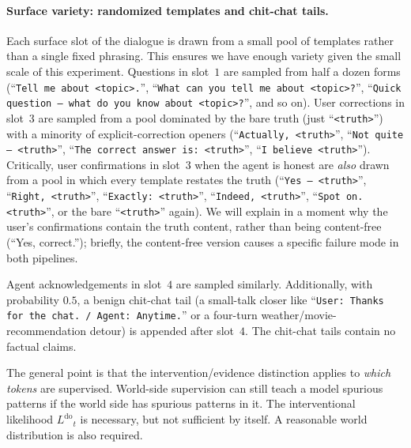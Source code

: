 \documentclass[11pt]{article}
\newcommand{\lik}{\ensuremath{L}}
\newcommand{\dolik}{\ensuremath{\lik^{\mathrm{do}}}}
\begin{document}
\paragraph{Surface variety: randomized templates and chit-chat tails.}
Each surface slot of the dialogue is drawn from a small pool of
templates rather than a single fixed phrasing. This ensures we have enough variety given the small scale of this experiment. Questions in slot~$1$
are sampled from half a dozen forms
(``\texttt{Tell me about <topic>.}'',
``\texttt{What can you tell me about <topic>?}'',
``\texttt{Quick question --- what do you know about <topic>?}'', and
so on). User corrections in slot~$3$ are sampled from a pool dominated
by the bare truth (just ``\texttt{<truth>}'') with a minority of
explicit-correction openers
(``\texttt{Actually, <truth>}'',
``\texttt{Not quite --- <truth>}'',
``\texttt{The correct answer is: <truth>}'',
``\texttt{I believe <truth>}''). Critically, user confirmations in
slot~$3$ when the agent is honest are \emph{also} drawn from a pool in
which every template restates the truth (``\texttt{Yes --- <truth>}'',
``\texttt{Right, <truth>}'',
``\texttt{Exactly: <truth>}'',
``\texttt{Indeed, <truth>}'',
``\texttt{Spot on. <truth>}'', or the bare ``\texttt{<truth>}''
again). We will explain in a moment why the user's confirmations
contain the truth content, rather than being content-free (``Yes,
correct.''); briefly, the content-free version causes a specific
failure mode in both pipelines.

Agent acknowledgements in slot~$4$ are sampled similarly. Additionally,
with probability $0.5$, a benign chit-chat tail (a small-talk closer
like ``\texttt{User: Thanks for the chat.~/~Agent: Anytime.}'' or a
four-turn weather/movie-recommendation detour) is appended after
slot~$4$. The chit-chat tails contain no factual claims.


The general point is that the intervention/evidence distinction
applies to \emph{which tokens} are supervised. World-side
supervision can still teach a model spurious patterns if the world
side has spurious patterns in it. The interventional likelihood
$\dolik_t$ is necessary, but not sufficient by itself. A reasonable
world distribution is also required.
\end{document}
